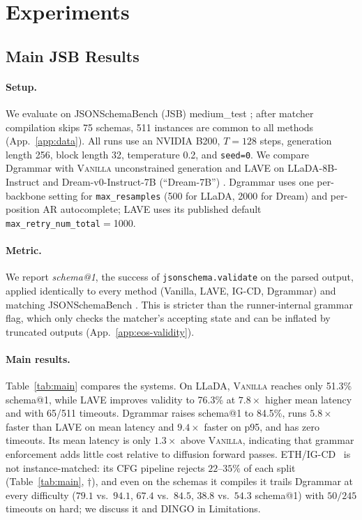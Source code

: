\documentclass[11pt]{article}
\begin{document}
\section{Experiments}
\label{sec:experiments}

\subsection{Main JSB Results}

\paragraph{Setup.} We evaluate on JSONSchemaBench (JSB) medium\_test \citep{jsonschemabench2025}; after matcher compilation skips 75 schemas, 511 instances are common to all methods (App.~\ref{app:data}). All runs use an NVIDIA B200, $T{=}128$ steps, generation length 256, block length 32, temperature 0.2, and \texttt{seed=0}. We compare Dgrammar with \textsc{Vanilla} unconstrained generation and LAVE \citep{lave2025} on LLaDA-8B-Instruct \citep{llada2025} and Dream-v0-Instruct-7B (``Dream-7B'') \citep{dream2025}. Dgrammar uses one per-backbone setting for \texttt{max\_resamples} (500 for LLaDA, 2000 for Dream) and per-position AR autocomplete; LAVE uses its published default \texttt{max\_retry\_num\_total}$=$1000.

\paragraph{Metric.} We report \emph{schema@1}, the success of \texttt{jsonschema.validate} on the parsed output, applied identically to every method (Vanilla, LAVE, IG-CD, Dgrammar) and matching JSONSchemaBench \citep{jsonschemabench2025}. This is stricter than the runner-internal grammar flag, which only checks the matcher's accepting state and can be inflated by truncated outputs (App.~\ref{app:eos-validity}).

\paragraph{Main results.} Table~\ref{tab:main} compares the systems. On LLaDA, \textsc{Vanilla} reaches only 51.3\% schema@1, while LAVE improves validity to 76.3\% at $7.8\times$ higher mean latency and with 65/511 timeouts. Dgrammar raises schema@1 to 84.5\%, runs $5.8\times$ faster than LAVE on mean latency and $9.4\times$ faster on p95, and has zero timeouts. Its mean latency is only $1.3\times$ above \textsc{Vanilla}, indicating that grammar enforcement adds little cost relative to diffusion forward passes. ETH/IG-CD~\citep{mundler2025} is not instance-matched: its CFG pipeline rejects $22$--$35\%$ of each split (Table~\ref{tab:main}, $\dagger$), and even on the schemas it compiles it trails Dgrammar at every difficulty ($79.1$ vs.\ $94.1$, $67.4$ vs.\ $84.5$, $38.8$ vs.\ $54.3$ schema@1) with $50/245$ timeouts on hard; we discuss it and DINGO in Limitations.
\end{document}
